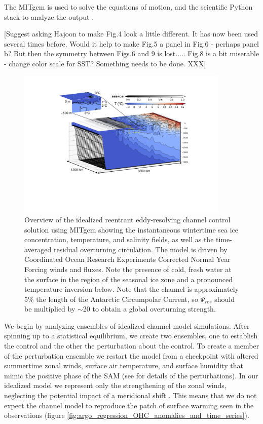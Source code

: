 \documentclass{ametsocV5}
\begin{document}
The MITgcm \citep{Marshall1997,Marshall1997b} is used to solve the equations of motion, and the scientific Python stack to analyze the output \citep{Hoyer2017,Hunter2007,Kluyver2016,Perez2007,VanDerWalt2011}.

[Suggest asking Hajoon to make Fig.4 look a little different. It has now been used several times before. Would it help to make Fig.5 a panel in Fig.6 - perhaps panel b? But then the symmetry between Figs.6 and 9 is lost.....
Fig.8 is a bit miserable - change color scale for SST? Something needs to be done. XXX]
\begin{figure}[!ht]
    \begin{center}
        \includegraphics[width=0.9\textwidth]{figures/T_snapshot_3D.pdf}
        \caption{Overview of the idealized reentrant eddy-resolving channel control solution using MITgcm \citep{Marshall1997,Marshall1997b} showing the instantaneous wintertime sea ice concentration, temperature, and salinity fields, as well as the time-averaged residual overturning circulation. The model is driven by Coordinated Ocean Research Experiments Corrected Normal Year Forcing winds and fluxes. Note the presence of cold, fresh water at the surface in the region of the seasonal ice zone and a pronounced temperature inversion below. Note that the channel is approximately 5\% the length of the Antarctic Circumpolar Current, so $\Psi_{res}$ should be multiplied by $\sim$20 to obtain a global overturning strength.}
        \label{fig:T_snapshot_3D}
    \end{center}
\end{figure}


We begin by analyzing ensembles of idealized channel model simulations. After spinning up to a statistical equilibrium, we create two ensembles, one to establish the control and the other the perturbation about the control. To create a member of the perturbation ensemble we restart the model from a checkpoint with altered summertime zonal winds, surface air temperature, and surface humidity that mimic the positive phase of the SAM (see \citet{Doddridge2019a} for details of the perturbations). In our idealized model we represent only the strengthening of the zonal winds, neglecting the potential impact of a meridional shift \citep[c.f.][]{Waugh2019}. This means that we do not expect the channel model to reproduce the patch of surface warming seen in the observations (figure \ref{fig:argo_regression_OHC_anomalies_and_time_series}).
\end{document}
